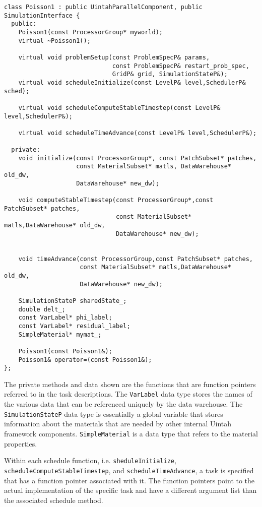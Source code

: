 \documentclass[12pt]{report}
\begin{document}
\begin{verbatim}
class Poisson1 : public UintahParallelComponent, public SimulationInterface {
  public:
    Poisson1(const ProcessorGroup* myworld);
    virtual ~Poisson1();

    virtual void problemSetup(const ProblemSpecP& params,
                              const ProblemSpecP& restart_prob_spec,
                              GridP& grid, SimulationStateP&);
    virtual void scheduleInitialize(const LevelP& level,SchedulerP& sched);

    virtual void scheduleComputeStableTimestep(const LevelP& level,SchedulerP&);

    virtual void scheduleTimeAdvance(const LevelP& level,SchedulerP&);

  private:
    void initialize(const ProcessorGroup*, const PatchSubset* patches,
                    const MaterialSubset* matls, DataWarehouse* old_dw,
                    DataWarehouse* new_dw);

    void computeStableTimestep(const ProcessorGroup*,const PatchSubset* patches,
                               const MaterialSubset* matls,DataWarehouse* old_dw,
                               DataWarehouse* new_dw);


    void timeAdvance(const ProcessorGroup,const PatchSubset* patches,
                     const MaterialSubset* matls,DataWarehouse* old_dw,
                     DataWarehouse* new_dw);

    SimulationStateP sharedState_;
    double delt_;
    const VarLabel* phi_label;
    const VarLabel* residual_label;
    SimpleMaterial* mymat_;

    Poisson1(const Poisson1&);
    Poisson1& operator=(const Poisson1&);
};
\end{verbatim}

The private methods and data shown are the functions that are function
pointers referred to in the task descriptions.  The \texttt{VarLabel}
data type stores the names of the various data that can be referenced
uniquely by the data warehouse.  The \texttt{SimulationStateP} data
type is essentially a global variable that stores information about
the materials that are needed by other internal Uintah framework
components.  \texttt{SimpleMaterial} is a data type that refers to the
material properties.

Within each schedule function, i.e. \texttt{sheduleInitialize},
\texttt{scheduleComputeStableTimestep}, and
\texttt{scheduleTimeAdvance}, a task is specified that has a function
pointer associated with it.  The function pointers point to the actual
implementation of the specific task and have a different argument list
than the associated schedule method.
\end{document}
